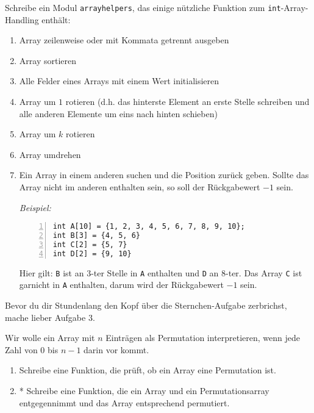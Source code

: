 \documentclass{uebungszettel}
\begin{document}
\newcommand{\ah}[2]{\ \\* \emph{(#1, #2)}\\}
\newcommand{\power}{\mathrm{power}}


\begin{aufg}
Schreibe ein Modul \verb|arrayhelpers|, das einige nützliche Funktion zum \verb|int|-Array-Handling enthält:
\begin{enumerate}
\item Array zeilenweise oder mit Kommata getrennt ausgeben
\item Array sortieren
\item Alle Felder eines Arrays mit einem Wert initialisieren
\item Array um $1$ rotieren (d.h. das hinterste Element an erste Stelle schreiben und alle anderen Elemente um eins nach hinten schieben)
\item Array um $k$ rotieren 
\item Array umdrehen
\item Ein Array in einem anderen suchen und die Position zurück geben. Sollte das Array nicht im anderen enthalten sein, so soll der Rückgabewert $-1$ sein.

\emph{Beispiel:} 
\begin{codelisting}
\begin{lstlisting}[numbers=left,numberstyle=\tiny,frame=tlrb]
int A[10] = {1, 2, 3, 4, 5, 6, 7, 8, 9, 10};
int B[3] = {4, 5, 6}
int C[2] = {5, 7}
int D[2] = {9, 10}
\end{lstlisting}
\end{codelisting}
Hier gilt: \verb|B| ist an $3$-ter Stelle in \verb|A| enthalten und \verb|D| an $8$-ter. Das Array \verb|C| ist garnicht in \verb|A| enthalten, darum wird der Rückgabewert $-1$ sein.

\end{enumerate}
\end{aufg}

\noindent Bevor du dir Stundenlang den Kopf über die Sternchen-Aufgabe zerbrichst, mache lieber Aufgabe 3.

\begin{aufg} Wir wolle ein Array mit $n$ Einträgen als Permutation interpretieren, wenn jede Zahl von $0$ bis $n-1$ darin vor kommt.
\begin{enumerate}
\item Schreibe eine Funktion, die prüft, ob ein Array eine Permutation ist.
\item * Schreibe eine Funktion, die ein Array und ein Permutationsarray entgegennimmt und das Array entsprechend permutiert.
\end{enumerate}
\end{aufg}
\end{document}
